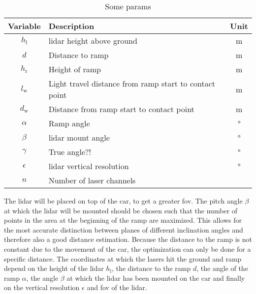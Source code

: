 \begin{table}[htbp]
	\centering
	\caption{Some params}
	\label{tab:vals}
	\begin{tabular}[t]{clc}
		\toprule
		\textbf{Variable} & \textbf{Description}                                   & \textbf{Unit} \\
		\midrule
		$h_\mathrm{l} $   & \gls{lidar} height above ground                        & \si{\metre}   \\
		$d$               & Distance to ramp                                       & \si{\metre}   \\
		$h_\mathrm{r}$    & Height of ramp                                         & \si{\metre}   \\
		$l_\mathrm{w}$    & Light travel distance from ramp start to contact point & \si{\metre}   \\
		$d_\mathrm{w}$    & Distance from ramp start to contact point              & \si{\metre}   \\
		$\alpha$          & Ramp angle                                             & \si{\degree}  \\
		$\beta$           & \gls{lidar} mount angle                                & \si{\degree}  \\
		$\gamma$          & True angle?!                                           & \si{\degree}  \\
		$\epsilon$        & \gls{lidar} vertical resolution                        & \si{\degree}  \\
		$n$               & Number of laser channels                               &               \\
		\bottomrule
	\end{tabular}
\end{table}
The \gls{lidar} will be placed on top of the car, to get a greater \gls{fov}.
The pitch angle $\beta$ at which the \gls{lidar} will be mounted should be chosen such that the number of points in the area at the beginning of the ramp are maximized.
This allows for the most accurate distinction between planes of different inclination angles and therefore also a good distance estimation.
Because the distance to the ramp is not constant due to the movement of the car, the optimization can only be done for a specific distance.
The coordinates at which the lasers hit the ground and ramp depend on the height of the \gls{lidar} $h_\mathrm{l}$, the distance to the ramp $d$, the angle of the ramp $\alpha$, the angle $\beta$ at which the \gls{lidar} has been mounted on the car and finally on the vertical resolution $\epsilon$ and \gls{fov} of the \gls{lidar}.

